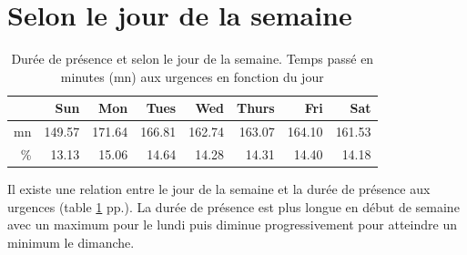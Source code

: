 \documentclass[12pt,english,french,twoside]{book}\usepackage[]{graphicx}\usepackage[]{color}
\begin{document}

\section{Selon le jour de la semaine}

\begin{table}[ht]
\centering
\begin{tabular}{rrrrrrrr}
  \hline
 & Sun & Mon & Tues & Wed & Thurs & Fri & Sat \\ 
  \hline
mn & 149.57 & 171.64 & 166.81 & 162.74 & 163.07 & 164.10 & 161.53 \\ 
  \% & 13.13 & 15.06 & 14.64 & 14.28 & 14.31 & 14.40 & 14.18 \\ 
   \hline
\end{tabular}
\caption[Durée de présence et jour de la semaine]{Durée de présence et selon le jour de la semaine. Temps passé en minutes (mn) aux urgences en fonction du jour} 
\label{tab:jour_semaine}
\end{table}



Il existe une relation entre le jour de la semaine et la durée de présence aux urgences (table \ref{tab:jour_semaine} pp.\pageref{tab:jour_semaine}). La durée de présence est plus longue en début de semaine avec un maximum pour le lundi puis diminue progressivement pour atteindre un minimum le dimanche.
\end{document}

